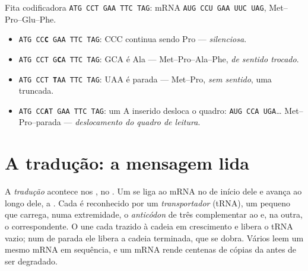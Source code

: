 \begin{example}\label{ex:g11:gene-expression:outcomes}
Fita codificadora \texttt{ATG CCT GAA TTC TAG}: mRNA
\texttt{AUG CCU GAA UUC UAG},  Met--Pro--Glu--Phe.
\begin{itemize}
  \item \texttt{ATG CC\textbf{C} GAA TTC TAG}: CCC continua sendo Pro
        --- \emph{silenciosa}.
  \item \texttt{ATG CCT G\textbf{C}A TTC TAG}: GCA é Ala ---
        Met--Pro--Ala--Phe, \emph{de sentido trocado}.
  \item \texttt{ATG CCT \textbf{T}AA TTC TAG}: UAA é parada ---
        Met--Pro, \emph{sem sentido}, uma  truncada.
  \item \texttt{ATG CC\textbf{A}T GAA TTC TAG}: um A inserido desloca
        o quadro: \texttt{AUG CCA UGA}\dots{} Met--Pro--parada ---
        \emph{deslocamento do quadro de leitura}.
\end{itemize}
\end{example}

\section{A tradução: a mensagem lida}

\begin{proposition}[A tradução]\label{prop:g11:gene-expression:translation}
A \emph{tradução} acontece nos \emph{}, no
. Um  se liga ao mRNA no  de início dele e
avança ao longo dele,  a . Cada  é reconhecido por um
\emph{ transportador} (tRNA), um pequeno  que carrega, numa
extremidade, o \emph{anticódon} de três  complementar ao
 e, na outra, o  correspondente. O  une cada
 trazido à cadeia em crescimento e libera o tRNA vazio; num
 de parada ele libera a cadeia terminada, que se dobra. Vários
 leem um mesmo mRNA em sequência, e um mRNA rende centenas de
cópias da  antes de ser degradado.
\end{proposition}
\admitted

